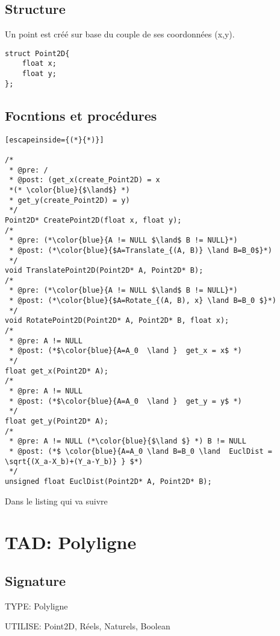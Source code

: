 \documentclass[a4paper, 11pt, oneside]{article}
\begin{document}
\subsection{Structure}
Un point est créé sur base du couple de ses coordonnées (x,y). 

\begin{lstlisting}
struct Point2D{
	float x;
	float y;
};
\end{lstlisting}

\subsection{Focntions et procédures}

\begin{lstlisting}[escapeinside={(*}{*)}]

/* 
 * @pre: /
 * @post: (get_x(create_Point2D) = x 
 *(* \color{blue}{$\land$} *)
 * get_y(create_Point2D) = y) 
 */
Point2D* CreatePoint2D(float x, float y);
/* 
 * @pre: (*\color{blue}{A != NULL $\land$ B != NULL}*)
 * @post: (*\color{blue}{$A=Translate_{(A, B)} \land B=B_0$}*)
 */
void TranslatePoint2D(Point2D* A, Point2D* B);
/* 
 * @pre: (*\color{blue}{A != NULL $\land$ B != NULL}*)
 * @post: (*\color{blue}{$A=Rotate_{(A, B), x} \land B=B_0 $}*)
 */
void RotatePoint2D(Point2D* A, Point2D* B, float x);
/* 
 * @pre: A != NULL
 * @post: (*$\color{blue}{A=A_0  \land }  get_x = x$ *)
 */
float get_x(Point2D* A);
/* 
 * @pre: A != NULL
 * @post: (*$\color{blue}{A=A_0  \land }  get_y = y$ *)
 */
float get_y(Point2D* A);
/* 
 * @pre: A != NULL (*\color{blue}{$\land $} *) B != NULL
 * @post: (*$ \color{blue}{A=A_0 \land B=B_0 \land  EuclDist = \sqrt{(X_a-X_b)+(Y_a-Y_b)} } $*)
 */
unsigned float EuclDist(Point2D* A, Point2D* B);
\end{lstlisting}

Dans le listing qui va suivre

\section{TAD: Polyligne}

\subsection{Signature}

\noindent TYPE: Polyligne

\noindent UTILISE: Point2D, Réels, Naturels, Boolean
\end{document}
